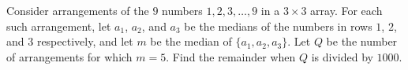 Consider arrangements of the $9$ numbers $1, 2, 3, \dots, 9$ in a $3 \times 3$ array. For each such arrangement, let $a_1$,  $a_2$,  and $a_3$ be the medians of the numbers in rows $1$,  $2$,  and $3$ respectively, and let $m$ be the median of $\{a_1, a_2, a_3\}$. Let $Q$ be the number of arrangements for which $m = 5$. Find the remainder when $Q$ is divided by $1000$.